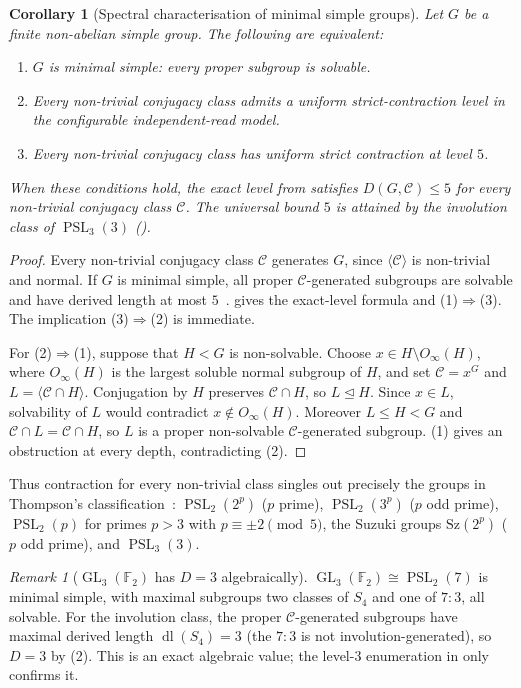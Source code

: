 \documentclass[11pt]{amsart}
\newtheorem{corollary}[corollary]{Corollary}
\theoremstyle{definition}
\theoremstyle{remark}
\newtheorem{remark}[remark]{Remark}
\theoremstyle{plain}
\theoremstyle{plain}
\numberwithin{equation}{section}
\DeclareMathOperator{\GL}{GL}
\DeclareMathOperator{\PSL}{PSL}
\newcommand{\F}{\mathbb{F}}
\begin{document}
\begin{corollary}[Spectral characterisation of minimal simple groups]
\label{cor:minsimple}
Let $G$ be a finite non-abelian simple group. The following are equivalent:
\begin{enumerate}[nosep,leftmargin=1.6em]
\item $G$ is minimal simple: every proper subgroup is solvable.
\item Every non-trivial conjugacy class admits a uniform strict-contraction
level in the configurable independent-read model.
\item Every non-trivial conjugacy class has uniform strict contraction at
level $5$.
\end{enumerate}
When these conditions hold, the exact level from 
satisfies $D(G,\mathcal C)\le5$ for every non-trivial conjugacy class
$\mathcal C$.
The universal bound $5$ is attained by the involution class of
$\PSL_3(3)$ ().
\end{corollary}
\begin{proof}
Every non-trivial conjugacy class $\mathcal C$ generates $G$, since
$\langle\mathcal C\rangle$ is non-trivial and normal. If $G$ is minimal
simple, all proper $\mathcal C$-generated subgroups are solvable and have
derived length at most $5$~\cite[Remark 2.3]{ErsoyTortoraTota2014}.
 gives the exact-level formula and (1)$\Rightarrow$(3).
The implication (3)$\Rightarrow$(2) is immediate.

For (2)$\Rightarrow$(1), suppose that $H<G$ is non-solvable. Choose
$x\in H\setminus O_\infty(H)$, where $O_\infty(H)$ is the largest soluble
normal subgroup of $H$, and set $\mathcal C=x^G$ and
$L=\langle\mathcal C\cap H\rangle$. Conjugation by $H$ preserves
$\mathcal C\cap H$, so $L\trianglelefteq H$. Since $x\in L$, solvability
of $L$ would contradict $x\notin O_\infty(H)$. Moreover $L\le H<G$ and
$\mathcal C\cap L=\mathcal C\cap H$, so $L$ is a proper non-solvable
$\mathcal C$-generated subgroup. (1) gives an
obstruction at every depth, contradicting (2).
\end{proof}

Thus contraction for every non-trivial class singles out precisely the
groups in Thompson's classification~\cite{Thompson1968}:
$\PSL_2(2^p)$ ($p$ prime), $\PSL_2(3^p)$ ($p$ odd prime), $\PSL_2(p)$ for
primes $p>3$ with $p\equiv\pm2\pmod5$, the Suzuki groups
$\mathrm{Sz}(2^p)$ ($p$ odd prime), and $\PSL_3(3)$.

\begin{remark}[$\GL_3(\F_2)$ has $D=3$ algebraically]
\label{rem:gl32}
$\GL_3(\F_2)\cong\PSL_2(7)$ is minimal simple, with maximal subgroups two classes of $S_4$
and one of $7{:}3$, all solvable. For the involution class, the proper
$\mathcal{C}$-generated subgroups have maximal derived length $\operatorname{dl}(S_4)=3$
(the $7{:}3$ is not involution-generated), so $D=3$ by (2). This is an
exact algebraic value; the level-$3$ enumeration in  only confirms it.
\end{remark}
\end{document}
